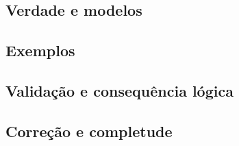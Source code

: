     \subsection{Verdade e modelos}
       
    \subsection{Exemplos}
    
    \subsection{Validação e consequência lógica}
    
    \subsection{Correção e completude}
    
